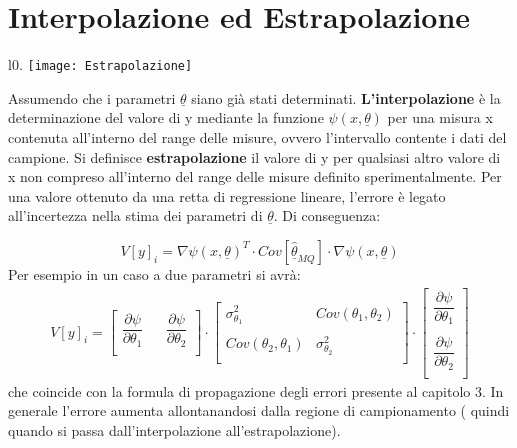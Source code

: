 \section{Interpolazione ed Estrapolazione}

\begin{wrapfigure}{l}{0.\textwidth}
\centering
\texttt{[image: Estrapolazione]}	
\end{wrapfigure}
Assumendo che i parametri $\underline{\theta}$ siano gi\`{a} stati determinati. \textbf{L'interpolazione} \`{e} la determinazione del valore di y mediante la funzione $\psi(x,\underline{\theta})$ per una misura x contenuta all'interno del range delle misure, ovvero l'intervallo contente i dati del campione. Si definisce \textbf{estrapolazione} il valore di y per qualsiasi altro valore di x non compreso all'interno del range delle misure definito sperimentalmente. Per una valore ottenuto da una retta di regressione lineare, l'errore \`{e} legato all'incertezza nella stima dei parametri di $\underline{\theta}$. Di conseguenza:

\begin{equation}
	V[y]_{i} = \nabla \psi(x,\underline{\theta})^T \cdot Cov[\underline{\hat{\theta}}_{MQ}] \cdot \nabla \psi(x,\underline{\theta}) 
\end{equation} 
Per esempio in un caso a due parametri si avr\`{a}:
\begin{align*}
V[y]_{i} = 
	\begin{bmatrix}
		\dfrac{\partial \psi}{\partial \theta_{1}} & & \dfrac{\partial \psi}{\partial \theta_{2}}  \\ 
	\end{bmatrix}
	\cdot 
	\begin{bmatrix}
		\sigma_{\theta_{1}}^2 & Cov(\theta_1,\theta_2) \\
		\\ 
		Cov(\theta_2,\theta_1) & \sigma_{\theta_{2}}^2 \\
	\end{bmatrix}
	\cdot 
	\begin{bmatrix}
		\dfrac{\partial \psi}{\partial \theta_{1}} \\
		\\
		\dfrac{\partial \psi}{\partial \theta_{2}} \\
	\end{bmatrix}
\end{align*}
che coincide con la formula di propagazione degli errori presente al capitolo 3. In generale l'errore aumenta allontanandosi dalla regione di campionamento ( quindi quando si passa dall'interpolazione all'estrapolazione).

